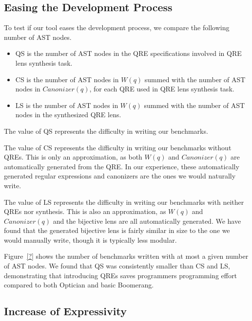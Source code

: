 \documentclass{svproc}
\newcommand{\canonizer}{\ensuremath{\mathit{Canonizer}}}
\newcommand{\QRESize}{QS}
\newcommand{\CanonizerAndSpecSize}{CS}
\newcommand{\LensAndSpecSize}{LS}
\begin{document}
\subsection{Easing the Development Process}

To test if our tool eases the development process, we compare the following
number of AST nodes.
%
\begin{itemize}
\item[\QRESize{}] \QRESize{} is the number of AST nodes in the QRE
  specifications involved in QRE lens synthesis task.
\item[\CanonizerAndSpecSize{}] \CanonizerAndSpecSize{} is the number of
  AST nodes in $W(q)$ summed with the number of AST nodes in $\canonizer(q)$,
  for each QRE used in QRE lens synthesis task.
\item[\LensAndSpecSize{}] \LensAndSpecSize{} is the number of AST nodes
  in $W(q)$ summed with the number of AST nodes in the synthesized QRE lens.
\end{itemize}

The value of \QRESize{} represents the difficulty in writing our benchmarks.

The value of \CanonizerAndSpecSize{} represents the difficulty in writing our
benchmarks without QREs.  This is only an approximation, as both $W(q)$ and
$\canonizer(q)$ are automatically generated from the QRE.  In our
experience, these automatically generated regular expressions and canonizers are
the ones we would naturally write.

The value of \LensAndSpecSize{} represents the difficulty in writing our benchmarks
with neither QREs nor synthesis.  This is also an approximation, as $W(q)$ and
$\canonizer(q)$ and the bijective lens are all automatically generated.
We have found that the generated bijective lens is fairly similar in size to the
one we would manually write, though it is typically less modular.

Figure~\ref{?} shows the number of benchmarks written with at most a given
number of AST nodes.  We found that \QRESize{} was consistently smaller than
\CanonizerAndSpecSize{} and \LensAndSpecSize{}, demonstrating that introducing
QREs saves programmers programming effort compared to both Optician and basic
Boomerang.

\subsection{Increase of Expressivity}
\end{document}
